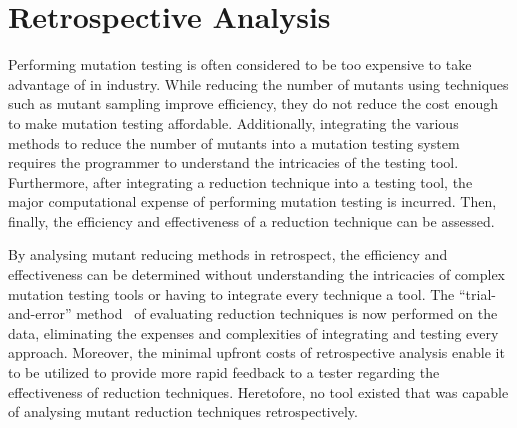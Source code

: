 \section{Retrospective Analysis}

Performing mutation testing is often considered to be too expensive to take advantage
of in industry. While reducing the number of mutants using techniques such as mutant
sampling improve efficiency, they do not reduce the cost enough to make mutation
testing affordable. Additionally, integrating the various methods to reduce the number
of mutants into a mutation testing system requires the programmer to understand the
intricacies of the testing tool. Furthermore, after integrating a reduction technique
into a testing tool, the major computational expense of performing mutation testing is incurred.
Then, finally, the efficiency and effectiveness of a reduction technique can be assessed.

By analysing mutant reducing methods in retrospect, the efficiency and effectiveness
can be determined without understanding the intricacies of complex mutation testing tools
or having to integrate every technique a tool. The ``trial-and-error'' method~\cite{edwards2004using}
of evaluating reduction techniques is now performed on the data, eliminating the expenses and
complexities of integrating and testing every approach. Moreover, the minimal upfront costs
of retrospective analysis enable it to be utilized to provide more rapid feedback to a tester
regarding the effectiveness of reduction techniques. Heretofore, no tool existed that
was capable of analysing mutant reduction techniques retrospectively.

